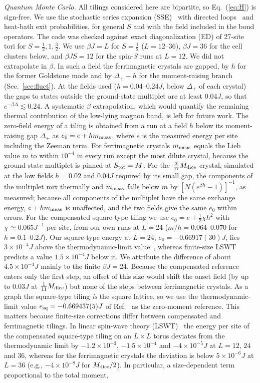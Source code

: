 \documentclass[prb,twocolumn,amsmath,amssymb,floatfix]{revtex4-2}
\newcommand{\Md}{M_{\rm dice}}
\begin{document}
\emph{Quantum Monte Carlo.} All tilings considered here are bipartite, so Eq.~(\ref{eq:H}) is sign-free. We use the stochastic series expansion (SSE)~\cite{Sandvik1999} with directed loops~\cite{Syljuasen2002} and heat-bath exit probabilities, for general $S$ and with the field included in the bond operators. The code was checked against exact diagonalization (ED) of 27-site tori for $S=\frac12,1,\frac32$. We use $\beta J=L$ for $S=\frac12$ ($L=12$--$36$), $\beta J=36$ for the cell clusters below, and $\beta JS=12$ for the spin-$S$ runs at $L=12$. We did not extrapolate in $\beta$. In such a field the ferrimagnetic crystals are gapped, by $h$ for the former Goldstone mode and by $\Delta_+-h$ for the moment-raising branch (Sec.~\ref{sec:fluct}). At the fields used ($h=0.04$--$0.24J$, below $\Delta_+$ of each crystal) the gaps to states outside the ground-state multiplet are at least $0.04J$, so that $e^{-\beta\Delta}\lesssim0.24$. A systematic $\beta$ extrapolation, which would quantify the remaining thermal contribution of the low-lying magnon band, is left for future work. The zero-field energy of a tiling is obtained from a run at a field $h$ below its moment-raising gap $\Delta_+$ as $e_0=e+hm_{\rm meas}$, where $e$ is the measured energy per site including the Zeeman term. For ferrimagnetic crystals $m_{\rm meas}$ equals the Lieb value $m$ to within $10^{-4}$ in every run except the most dilute crystal, because the ground-state multiplet is pinned at $S_{\rm tot}=M$. For the $\frac3{47}\Md$ crystal, simulated at the low fields $h=0.02$ and $0.04J$ required by its small gap, the components of the multiplet mix thermally and $m_{\rm meas}$ falls below $m$ by $[N(e^{\beta h}-1)]^{-1}$, as measured; because all components of the multiplet have the same exchange energy, $e+hm_{\rm meas}$ is unaffected, and the two fields give the same $e_0$ within errors. For the compensated square-type tiling we use $e_0=e+\frac12\chi h^2$ with $\chi\simeq0.065J^{-1}$ per site, from our own runs at $L=24$ ($m/h=0.064$--$0.070$ for $h=0.1$--$0.2J$). Our square-type energy at $L=24$, $e_0=-0.66917(30)J$, lies $3\times10^{-4}J$ above the thermodynamic-limit value~\cite{Sandvik1997}, whereas finite-size LSWT predicts a value $1.5\times10^{-4}J$ below it. We attribute the difference of about $4.5\times10^{-4}J$ mainly to the finite $\beta J=24$. Because the compensated reference enters only the first step, an offset of this size would shift the onset field (by up to $0.03J$ at $\frac1{11}\Md$) but none of the steps between ferrimagnetic crystals. As a graph the square-type tiling \emph{is} the square lattice, so we use the thermodynamic-limit value $e_{\rm sq}=-0.669437(5)J$ of Ref.~\cite{Sandvik1997} as the zero-moment reference. This matters because finite-size corrections differ between compensated and ferrimagnetic tilings. In linear spin-wave theory (LSWT)~\cite{HolsteinPrimakoff1940} the energy per site of the compensated square-type tiling on an $L\times L$ torus deviates from the thermodynamic limit by $-1.2\times10^{-3}$, $-1.5\times10^{-4}$ and $-4\times10^{-5}J$ at $L=12$, $24$ and $36$, whereas for the ferrimagnetic crystals the deviation is below $5\times10^{-6}J$ at $L=36$ (e.g., $-4\times10^{-8}J$ for $\Md/2$). In particular, a size-dependent term proportional to the total moment, 
\end{document}
